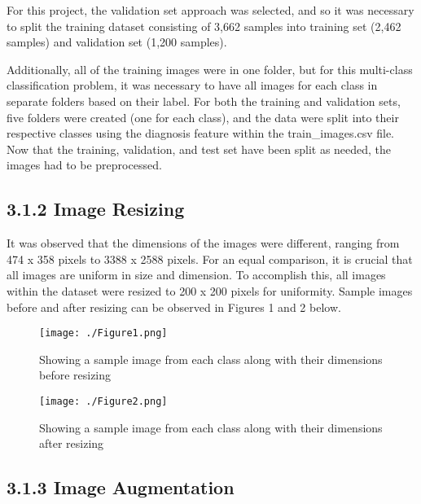\documentclass[
]{article}
\begin{document}
For this project, the validation set approach was selected, and so it
was necessary to split the training dataset consisting of 3,662 samples
into training set (2,462 samples) and validation set (1,200 samples).

Additionally, all of the training images were in one folder, but for
this multi-class classification problem, it was necessary to have all
images for each class in separate folders based on their label. For both
the training and validation sets, five folders were created (one for
each class), and the data were split into their respective classes using
the diagnosis feature within the train\_images.csv file. Now that the
training, validation, and test set have been split as needed, the images
had to be preprocessed.

\hypertarget{image-resizing}{%
\subsection{\texorpdfstring{\textbf{3.1.2 Image
Resizing}}{3.1.2 Image Resizing}}\label{image-resizing}}

It was observed that the dimensions of the images were different,
ranging from 474 x 358 pixels to 3388 x 2588 pixels. For an equal
comparison, it is crucial that all images are uniform in size and
dimension. To accomplish this, all images within the dataset were
resized to 200 x 200 pixels for uniformity. Sample images before and
after resizing can be observed in Figures 1 and 2 below.

\begin{figure}[h]
  \centering
  \texttt{[image: ./Figure1.png]}
  \caption{Showing a sample image from each class along with their
dimensions before resizing}
  \label{fig:figure1}
\end{figure}

\begin{figure}[h]
  \centering
  \texttt{[image: ./Figure2.png]}
  \caption{Showing a sample image from each class along with their
dimensions after resizing}
  \label{fig:figure2}
\end{figure}

\hypertarget{image-augmentation}{%
\subsection{\texorpdfstring{\textbf{3.1.3 Image
Augmentation}}{3.1.3 Image Augmentation}}\label{image-augmentation}}
\end{document}
